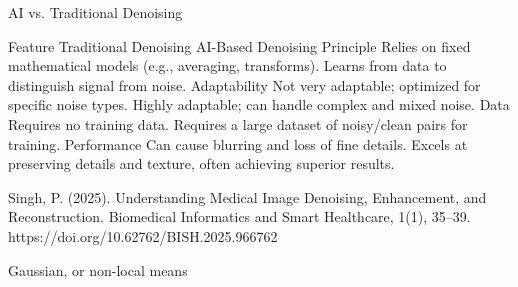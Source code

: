 AI vs. Traditional Denoising

Feature	Traditional Denoising	AI-Based Denoising
Principle	Relies on fixed mathematical models (e.g., averaging, transforms).	Learns from data to distinguish signal from noise.
Adaptability	Not very adaptable; optimized for specific noise types.	Highly adaptable; can handle complex and mixed noise.
Data	Requires no training data.	Requires a large dataset of noisy/clean pairs for training.
Performance	Can cause blurring and loss of fine details.	Excels at preserving details and texture, often achieving superior results.

Singh, P. (2025). Understanding Medical Image Denoising, Enhancement, and Reconstruction. Biomedical Informatics and Smart Healthcare, 1(1), 35–39. https://doi.org/10.62762/BISH.2025.966762

Gaussian,  or non-local means